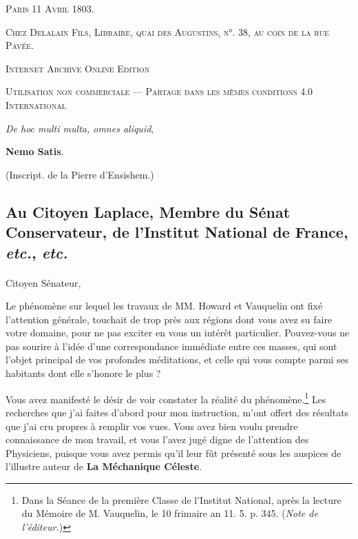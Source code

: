 \documentclass[a4paper, 11pt, oneside, polutonikogreek, french]{article}
\begin{document}
\begin{titlepage}
	\vspace{1\baselineskip}

	{\small\scshape Paris 11 Avril 1803.}
	
	{\small\scshape{Chez Delalain Fils, Libraire, quai des Augustins, n°. 38, au coin de la rue Pavée.}}
	
	\vspace{0.5\baselineskip} %

        \scshape Internet Archive Online Edition  %
	
	{\scshape\small Utilisation non commerciale --- Partage dans les mêmes conditions 4.0 International} %
\end{titlepage}
\setlength{\parskip}{1mm plus1mm minus1mm}
\clearpage
\vspace*{\fill}
\begin{center}
{\Large \emph{De hoc multi multa, omnes aliquid},}

\textbf{Nemo Satis}.

(Inscript. de la Pierre d'Ensishem.)
\end{center}
\vspace*{\fill}
\clearpage
\tableofcontents
\clearpage
\subsection*{Au Citoyen Laplace, Membre du Sénat Conservateur, de l'Institut National de France, \emph{etc.}, \emph{etc.}}
\paragraph{}
Citoyen Sénateur,

Le phénomène sur lequel les travaux de MM. Howard et Vauquelin ont fixé l'attention générale, touchait de trop près aux régions dont vous avez su faire votre domaine, pour ne pas exciter en vous un intérêt particulier. Pouvez-vous ne pas sourire à l'idée d'une correspondance immédiate entre ces masses, qui sont l'objet principal de vos profondes méditations, et celle qui vous compte parmi ses habitants dont elle s'honore le plus ?

Vous avez manifesté le désir de voir constater la réalité du phénomène.\footnote{Dans la Séance de la première Classe de l'Institut National, après la lecture du Mémoire de M. Vauquelin, le 10 frimaire an 11. 5. p. 345. (\emph{Note de l'éditeur.})} Les recherches que j'ai faites d'abord pour mon instruction, m'ont offert des résultats que j'ai cru propres à remplir vos vues. Vous avez bien voulu prendre connaissance de mon travail, et vous l'avez jugé digne de l'attention des Physiciens, puisque vous avez permis qu'il leur fût présenté sous les auspices de l'illustre auteur de \textbf{La Méchanique Céleste}.
\end{document}
